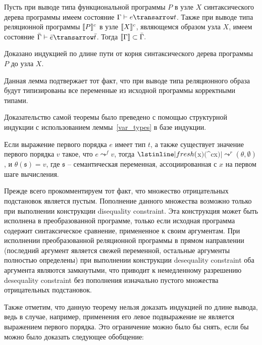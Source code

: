 \setarrow{:}
\begin{lemma}
\label{var_types}
\normalfont Пусть при выводе типа функциональной программы $P$ в узле $X$ синтаксического дерева программы имеем состояние $\typed{\Gamma}{e}{t}$. Также при выводе типа реляционной программы $\llbracket{P}\rrbracket^c$ в узле $\llbracket{X}\rrbracket^c$, являющемся образом узла $X$, имеем состояние $\typed{\bar{\Gamma}}{\bar{e}}{\bar{t}}$. Тогда $\llbracket{\Gamma}\rrbracket \subset \bar{\Gamma}.$

Доказано индукцией по длине пути от корня синтаксического дерева программы $P$ до узла $X$.
\end{lemma}

Данная лемма подтвержает тот факт, что при выводе типа реляционного образа будут типизированы все переменные из исходной программы корректными типами.

Доказательство самой теоремы было преведено с помощью структурной индукции с использованием леммы~\ref{var_types} в базе индукции.

\begin{theorem} 
\normalfont Если выражение первого порядка $e$ имеет тип $t$, а также существует значение первого порядка $v$ такое, что \mbox{$e \leadsto^f v$}, тогда \mbox{$\lstinline|fresh ($x$) ($^c\;x$)| \leadsto^r (\theta,\emptyset)$}, и \mbox{$\theta(\mathfrak{s})=v$}, где $\mathfrak{s}$ -- семантическая переменная, ассоциированная с $x$ на первом шаге вычисления.
\end{theorem}

Прежде всего прокомментируем тот факт, что множество отрицательных подстановок является пустым. Пополнение данного множества возможно только при выполнении конструкции disequality constraint. Эта конструкция может быть исполнена в преобразованной программе, только если исходная программа содержит синтаксическое сравнение, примененное к своим аргументам. При исполнении преобразованной реляционной программы в прямом направлении (последний аргумент является свежей переменной, остальные аргументы полностью определены) при выполнении конструкции desequality constraint оба аргумента являются замкнутыми, что приводит к немедленному разрешению desequality constraint без пополнения изначально пустого множества отрицательных подстановок.

Также отметим, что данную теорему нельзя доказать индукцией по длине вывода, ведь в случае, например, применения его левое подвыражение не является выражением первого порядка. Это ограничение можно было бы снять, если бы можно было доказать следующее обобщение:

